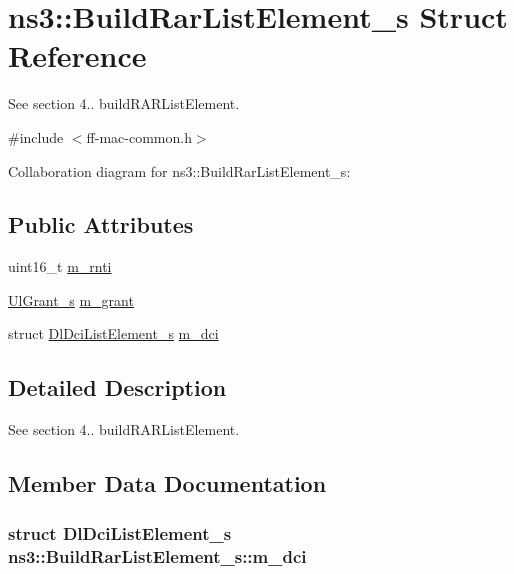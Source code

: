 \hypertarget{structns3_1_1BuildRarListElement__s}{}\section{ns3\+:\+:Build\+Rar\+List\+Element\+\_\+s Struct Reference}
\label{structns3_1_1BuildRarListElement__s}


See section 4.. build\+R\+A\+R\+List\+Element.  




{\ttfamily \#include $<$ff-\/mac-\/common.\+h$>$}



Collaboration diagram for ns3\+:\+:Build\+Rar\+List\+Element\+\_\+s\+:
\subsection*{Public Attributes}
\begin{DoxyCompactItemize}
\item 
uint16\+\_\+t \hyperlink{structns3_1_1BuildRarListElement__s_a1684672178ed89847a81d2f53a0fcf92}{m\+\_\+rnti}
\item 
\hyperlink{structns3_1_1UlGrant__s}{Ul\+Grant\+\_\+s} \hyperlink{structns3_1_1BuildRarListElement__s_acd5001d775fe5373d8f5a946faf9eab4}{m\+\_\+grant}
\item 
struct \hyperlink{structns3_1_1DlDciListElement__s}{Dl\+Dci\+List\+Element\+\_\+s} \hyperlink{structns3_1_1BuildRarListElement__s_a70c2fbf235a8c2a9f594c428e7bdf712}{m\+\_\+dci}
\end{DoxyCompactItemize}


\subsection{Detailed Description}
See section 4.. build\+R\+A\+R\+List\+Element. 

\subsection{Member Data Documentation}
\subsubsection[{\texorpdfstring{m\+\_\+dci}{m_dci}}]{\setlength{\rightskip}{0pt plus 5cm}struct {\bf Dl\+Dci\+List\+Element\+\_\+s} ns3\+::\+Build\+Rar\+List\+Element\+\_\+s\+::m\+\_\+dci}\hypertarget{structns3_1_1BuildRarListElement__s_a70c2fbf235a8c2a9f594c428e7bdf712}{}\label{structns3_1_1BuildRarListElement__s_a70c2fbf235a8c2a9f594c428e7bdf712}
